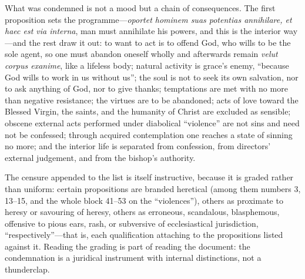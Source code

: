 What was condemned is not a mood but a chain of consequences. The first proposition sets the programme---\emph{oportet hominem suas potentias annihilare, et haec est via interna}, man must annihilate his powers, and this is the interior way---and the rest draw it out: to want to act is to offend God, who wills to be the sole agent, so one must abandon oneself wholly and afterwards remain \emph{velut corpus exanime}, like a lifeless body; natural activity is grace's enemy, ``because God wills to work in us without us''; the soul is not to seek its own salvation, nor to ask anything of God, nor to give thanks; temptations are met with no more than negative resistance; the virtues are to be abandoned; acts of love toward the Blessed Virgin, the saints, and the humanity of Christ are excluded as sensible; obscene external acts performed under diabolical ``violence'' are not sins and need not be confessed; through acquired contemplation one reaches a state of sinning no more; and the interior life is separated from confession, from directors' external judgement, and from the bishop's authority.

The censure appended to the list is itself instructive, because it is graded rather than uniform: certain propositions are branded heretical (among them numbers 3, 13--15, and the whole block 41--53 on the ``violences''), others as proximate to heresy or savouring of heresy, others as erroneous, scandalous, blasphemous, offensive to pious ears, rash, or subversive of ecclesiastical jurisdiction, ``respectively''---that is, each qualification attaching to the propositions listed against it. Reading the grading is part of reading the document: the condemnation is a juridical instrument with internal distinctions, not a thunderclap.


